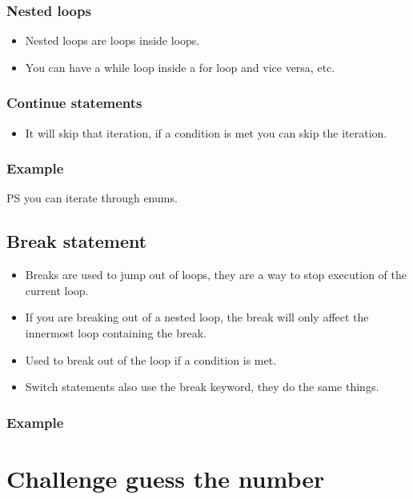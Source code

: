 \subsubsection{Nested loops}
\begin{itemize}
    \item Nested loops are loops inside loops. 
    \item You can have a while loop inside a for loop and vice versa, etc. 
\end{itemize}
\subsubsection{Continue statements}
\begin{itemize}
    \item It will skip that iteration, if a condition is met you can skip the iteration. 
\end{itemize}
\subsubsection{Example}
PS you can iterate through enums. 

\subsection{Break statement}
\begin{itemize}
    \item Breaks are used to jump out of loops, they are a way to stop execution of the current loop. 
    \item If you are breaking out of a nested loop, the break will only affect the innermost loop containing the break.
    \item Used to break out of the loop if a condition is met. 
    \item Switch statements also use the break keyword, they do the same things. 
\end{itemize}
\subsubsection{Example}

\section{Challenge guess the number}


